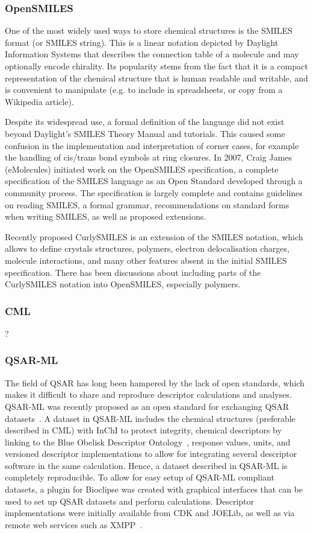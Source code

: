 \documentclass[10pt]{bmc_article}
\newenvironment{bmcformat}{\begin{raggedright}\baselineskip20pt\sloppy\setboolean{publ}{false}}{\end{raggedright}\baselineskip20pt\sloppy}
\begin{document}
\begin{bmcformat}
    \subsubsection*{OpenSMILES}

One of the most widely used ways to store chemical structures is the
SMILES format (or SMILES string). This is a linear notation depicted
by Daylight Information Systems that describes the connection table
of a molecule and may optionally encode chirality. Its popularity
stems from the fact that it is a compact representation of the
chemical structure that is human readable and writable, and is
convenient to manipulate (e.g. to include in spreadsheets, or copy
from a Wikipedia article).

Despite its widespread use, a formal
definition of the language did not exist beyond Daylight's SMILES
Theory Manual and tutorials. This caused some confusion in the
implementation and interpretation of corner cases, for example the
handling of cis/trans bond symbols at ring closures. In 2007, Craig
James (eMolecules) initiated work on the OpenSMILES specification, a
complete specification of the SMILES language as an Open Standard
developed through a community process. The specification is largely
complete and contains guidelines on reading SMILES, a formal
grammar, recommendations on standard forms when writing SMILES, as
well as proposed extensions.

Recently proposed CurlySMILES\cite{CurlySMILES} is an extension of the
SMILES notation, which allows to define crystals structures, polymers,
electron delocalisation charges, molecule interactions, and many other
features absent in the initial SMILES specification. There has been
discussions about including parts of the CurlySMILES notation into
OpenSMILES, especially polymers.

\subsubsection*{CML}
?


\subsubsection*{QSAR-ML}
The field of QSAR has long been hampered by the lack of open standards, which makes it difficult to share and reproduce descriptor calculations and analyses. QSAR-ML was recently proposed as an open standard for exchanging QSAR datasets~\cite{Spjuth:2010uq}. A dataset in QSAR-ML includes the chemical structures (preferable described in CML) with InChI to protect integrity, chemical descriptors by linking to the Blue Obelisk Descriptor Ontology~\cite{bodo}, response values, units, and versioned descriptor implementations to allow for integrating several descriptor software in the same calculation. Hence, a dataset described in QSAR-ML is completely reproducible. To allow for easy setup of QSAR-ML compliant datasets, a plugin for Bioclipse was created with graphical interfaces that can be used to set up QSAR datasets and perform calculations. Descriptor implementations were initially available from CDK and JOELib, as well as via remote web services such as XMPP~\cite{Wagener:2009uq}.



\end{bmcformat}
\end{document}

